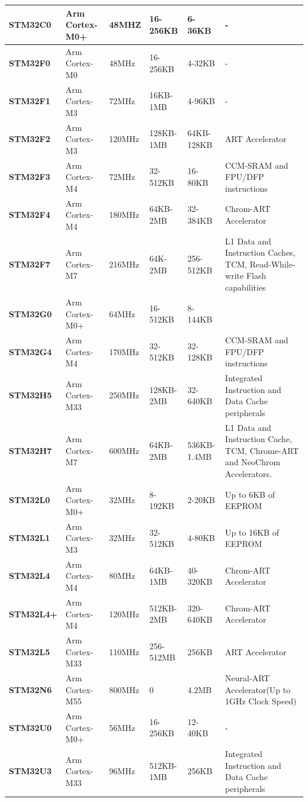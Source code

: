 \begin{xltabular}{\linewidth}{@{}>{\bfseries}l X@{} X@{} X@{} X@{} X@{}}
	STM32C0 &
	Arm Cortex-M0+ &
	48MHZ & 16-256KB & 6-36KB & - \\
	\midrule
	STM32F0 &
	Arm Cortex-M0 &
	48MHz & 16-256KB & 4-32KB & - \\
	\midrule
	STM32F1 &
	Arm Cortex-M3 &
	72MHz & 16KB-1MB & 4-96KB & - \\
	\midrule
	STM32F2 &
	Arm Cortex-M3 &
	120MHz & 128KB-1MB & 64KB-128KB & ART Accelerator \\
	\midrule
	STM32F3 &
	Arm Cortex-M4 &
	72MHz & 32-512KB & 16-80KB & CCM-SRAM and FPU/DFP instructions \\
	\midrule
	STM32F4 &
	Arm Cortex-M4 &
	180MHz & 64KB-2MB & 32-384KB & Chrom-ART Accelerator\\
	\midrule
	STM32F7 &
	Arm Cortex-M7 &
	216MHz & 64K-2MB & 256-512KB & L1 Data and Instruction Caches, TCM, Read-While-write Flash capabilities \\
	\midrule
	STM32G0 &
	Arm Cortex-M0+ &
	64MHz & 16-512KB & 8-144KB & \\
	\midrule
	STM32G4 &
	Arm Cortex-M4 &
	170MHz & 32-512KB & 32-128KB & CCM-SRAM and FPU/DFP instructions \\
	\midrule
	STM32H5 &
	Arm Cortex-M33 &
	250MHz & 128KB-2MB & 32-640KB & Integrated Instruction and Data Cache peripherals \\
	\midrule
	STM32H7 &
	Arm Cortex-M7 &
	600MHz & 64KB-2MB & 536KB-1.4MB & L1 Data and Instruction Cache, TCM, Chrome-ART and NeoChrom Accelerators.  \\
	\midrule
	STM32L0 &
	Arm Cortex-M0+ &
	32MHz & 8-192KB & 2-20KB & Up to 6KB of EEPROM \\
	\midrule
	STM32L1 &
	Arm Cortex-M3 &
	32MHz & 32-512KB & 4-80KB & Up to 16KB of EEPROM \\
	\midrule
	STM32L4 &
	Arm Cortex-M4 &
	80MHz & 64KB-1MB & 40-320KB & Chrom-ART Accelerator \\
	\midrule
	STM32L4+ &
	Arm Cortex-M4 &
	120MHz & 512KB-2MB & 320-640KB & Chrom-ART Accelerator \\
	\midrule
	STM32L5 &
	Arm Cortex-M33 &
	110MHz & 256-512MB & 256KB & ART Accelerator \\
	\midrule
	STM32N6 &
	Arm Cortex-M55 &
	800MHz & 0 & 4.2MB & Neural-ART Accelerator(Up to 1GHz Clock Speed) \\
	\midrule
	STM32U0 &
	Arm Cortex-M0+ &
	56MHz & 16-256KB & 12-40KB & - \\
	\midrule
	STM32U3 &
	Arm Cortex-M33 &
	96MHz & 512KB-1MB & 256KB & Integrated Instruction and Data Cache peripherals \\

\end{xltabular}
